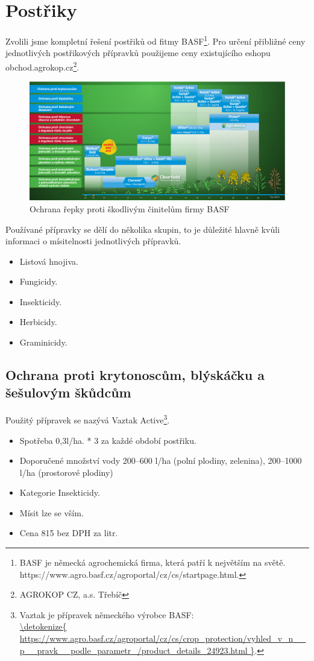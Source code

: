 
\section{Postřiky}
Zvolili jsme kompletní řešení postřiků od fitmy BASF\footnote{BASF je německá agrochemická firma, která patří k 
největším na světě.\\https://www.agro.basf.cz/agroportal/cz/cs/startpage.html.}.
Pro určení přibližné ceny jednotlivých postřikových přípravků použijeme ceny existujícího eshopu obchod.agrokop.cz\footnote{AGROKOP CZ, a.s. Třebíč}.
\begin{figure}[ht!]
\centering
\includegraphics[width=170mm]{img/basf_postriky.eps}
\caption{Ochrana řepky proti škodlivým činitelům firmy BASF \label{basf_postriky}}
\end{figure}
Používané přípravky se dělí do několika skupin, to je důležité hlavně kvůli informaci o mísitelnosti jednotlivých přípravků.
\begin{itemize}
  \item Listová hnojiva.
  \item Fungicidy.
  \item Insekticidy.
  \item Herbicidy.
  \item Graminicidy.
\end{itemize}

\subsection{Ochrana proti krytonoscům, blýskáčku a šešulovým škůdcům}
Použitý přípravek se nazývá Vaztak Active\footnote{Vaztak je přípravek německého výrobce BASF: \\\url{\detokenize{
https://www.agro.basf.cz/agroportal/cz/cs/crop_protection/vyhled_v_n__p__pravk__podle_parametr_/product_details_24923.html
}}.}.
\begin{itemize}
  \item Spotřeba 0,3l/ha. * 3 za každé období postřiku.
  \item Doporučené množství vody 200–600 l/ha (polní plodiny, zelenina), 200–1000 l/ha (prostorové plodiny) 
  \item Kategorie Insekticidy.
  \item Mísit lze se vším.
  \item Cena 815 bez DPH za litr.
\end{itemize}

